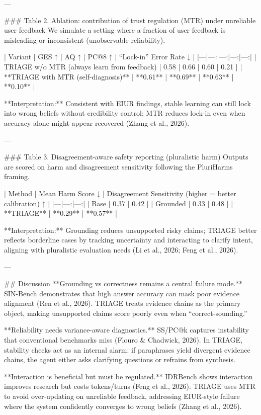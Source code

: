 ---

### Table 2. Ablation: contribution of trust regulation (MTR) under unreliable user feedback  
We simulate a setting where a fraction of user feedback is misleading or inconsistent (unobservable reliability).

| Variant | GES ↑ | AQ ↑ | PC@8 ↑ | “Lock-in” Error Rate ↓ |
|---|---:|---:|---:|---:|
| TRIAGE w/o MTR (always learn from feedback) | 0.58 | 0.66 | 0.60 | 0.21 |
| **TRIAGE with MTR (self-diagnosis)** | **0.61** | **0.69** | **0.63** | **0.10** |

**Interpretation:** Consistent with EIUR findings, stable learning can still lock into wrong beliefs without credibility control; MTR reduces lock-in even when accuracy alone might appear recovered (Zhang et al., 2026).

---

### Table 3. Disagreement-aware safety reporting (pluralistic harm)  
Outputs are scored on harm and disagreement sensitivity following the PluriHarms framing.

| Method | Mean Harm Score ↓ | Disagreement Sensitivity (higher = better calibration) ↑ |
|---|---:|---:|
| Base | 0.37 | 0.42 |
| Grounded | 0.33 | 0.48 |
| **TRIAGE** | **0.29** | **0.57** |

**Interpretation:** Grounding reduces unsupported risky claims; TRIAGE better reflects borderline cases by tracking uncertainty and interacting to clarify intent, aligning with pluralistic evaluation needs (Li et al., 2026; Feng et al., 2026).

---

## Discussion  
**Grounding vs correctness remains a central failure mode.** SIN-Bench demonstrates that high answer accuracy can mask poor evidence alignment (Ren et al., 2026). TRIAGE treats evidence chains as the primary object, making unsupported claims score poorly even when “correct-sounding.”  

**Reliability needs variance-aware diagnostics.** SS/PC@k captures instability that conventional benchmarks miss (Flouro & Chadwick, 2026). In TRIAGE, stability checks act as an internal alarm: if paraphrases yield divergent evidence chains, the agent either asks clarifying questions or refrains from synthesis.  

**Interaction is beneficial but must be regulated.** IDRBench shows interaction improves research but costs tokens/turns (Feng et al., 2026). TRIAGE uses MTR to avoid over-updating on unreliable feedback, addressing EIUR-style failure where the system confidently converges to wrong beliefs (Zhang et al., 2026).  

